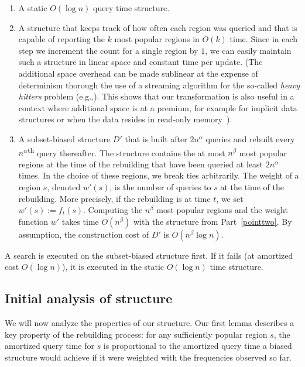\documentclass[11pt]{article}
\newcommand{\eqdef}{:=}
\begin{document}
\begin{enumerate}

\item A static $O(\log n)$ query time structure. 

\item \label{pointtwo} A structure that keeps track of how often
each region was queried and that is capable of reporting the 
$k$ most popular regions in
$O(k)$ time. Since in each step we increment the count
for a single region by $1$, we can easily maintain such a structure in 
linear space and constant time per update. 
(The additional space overhead can be made sublinear at the expense 
of determinism thorough the use of a streaming algorithm for the 
so-called \emph{heavy hitters} problem (e.g.,\cite{BerindeInCoSt10}). 
This shows that our transformation
is also useful in a context where additional space is at a
premium, for example for implicit data structures or when
the data resides in read-only 
memory~\cite{AsanoMuRoWa11}).

\item A subset-biased structure $D'$ that is built after 
$2n^\alpha$ queries and rebuilt every
$n^\alpha$\textsuperscript{th} query thereafter. The structure 
contains the at most 
$n^\beta$ most popular regions at the time of the rebuilding
that have been queried at least $2n^\alpha$ times.
In the choice of these regions, we break ties arbitrarily.
The weight of a region $s$, denoted $w'(s)$, is the number of queries to 
$s$ at the time of the
rebuilding. More precisely, if the rebuilding is at time $t$, we set 
$w'(s) \eqdef f_t(s)$.
Computing the $n^\beta$ most popular regions and the weight function
$w'$ takes time $O(n^\beta)$ with the structure from Part~\ref{pointtwo}.  
By assumption, the construction cost of $D'$
is $O(n^\beta \log n)$.  
\end{enumerate}

\noindent A search is executed on the subset-biased structure first. If it
fails (at amortized cost $O(\log n)$), it is executed in the 
static $O(\log n)$ time structure. 


\subsection{Initial analysis of structure}

We will now analyze the properties of our structure.
Our first lemma describes a key property of the rebuilding process:
for any sufficiently popular region $s$, the amortized query time for $s$ is 
proportional to the amortized query time a biased structure
would achieve if it were weighted with the frequencies observed so far.
\end{document}
